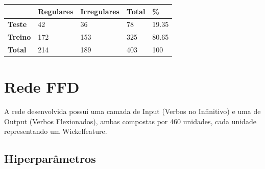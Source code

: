 \begin{table}[H]
\begin{center}
\begin{tabular}{lllll}
\hline
 & \textbf{Regulares} & \textbf{Irregulares} & \textbf{Total} & \textbf{\%} \\ \hline
\textbf{Teste} & 42 & 36 & 78 & 19.35 \\ \hline
\textbf{Treino} & 172 & 153 & 325 & 80.65 \\ \hline
\textbf{Total} & 214 & 189 & 403 & 100 \\ \hline
\end{tabular}
\end{center}
\end{table}
\label{tab:ratios}

\section{Rede FFD}
\label{sec:ffd}

A rede desenvolvida possui uma camada de Input (Verbos no Infinitivo) e uma de Output (Verbos Flexionados), ambas compostas por 460 unidades, cada unidade representando um Wickelfeature.

\subsection{Hiperparâmetros}

